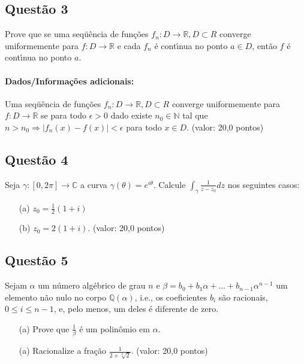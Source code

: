 \subsection{\color{blue} Quest\~ao 3}

Prove que se uma seqü\^encia de fun\c c\~oes $f_n: D \to \mathbb R, D \subset R$ converge uniformemente para $f: D \to \mathbb R$ e cada $f_n$ \'e cont\'\i nua no ponto $a \in D$, ent\~ao $f$ \'e cont\'\i nua no ponto $a$.

\paragraph{Dados/Informa\c c\~oes adicionais:} Uma seqü\^encia de fun\c c\~oes $f_n: D \to \mathbb R, D \subset R$ converge uniformemente para $f: D \to \mathbb R$ se para todo $\epsilon > 0$ dado existe $n_0 \in \mathbb N$ tal que $n > n_0 \Longrightarrow |f_n(x) - f(x)| < \epsilon$ para todo $x \in D$. (valor: 20,0 pontos)

\subsection{\color{blue} Quest\~ao 4}

Seja $\gamma: [0,2\pi] \to \mathbb C$ a curva $\gamma (\theta) = e^{i\theta}$. Calcule $\displaystyle \int_\gamma \frac1{z-z_0} dz$ nos seguintes casos:

\begin{enumerate}

\item[(a)] $z_0=\displaystyle \frac1{2} (1+i)$

\item[(b)] $z_0 = 2(1 + i)$. (valor: 20,0 pontos)

\end{enumerate}

\subsection{\color{blue} Quest\~ao 5}

Sejam $\alpha$ um n\'umero alg\'ebrico de grau $n$ e  $\beta = b_0 + b_1\alpha + ... + b_{n-1}\alpha^{n-1}$ um elemento n\~ao nulo no corpo $\mathbb Q(\alpha)$, i.e., os coeficientes $b_i$ s\~ao racionais, $0 \leq i \leq n-1$, e, pelo menos, um deles \'e diferente de zero.

\begin{enumerate}

\item[(a)] Prove que $\displaystyle\frac1{\beta}$ \'e um polinômio em $\alpha$.

\item[(a)] Racionalize a fra\c c\~ao $\displaystyle \frac1{2+\sqrt[3]{2}}$. (valor: 20,0 pontos)

\end{enumerate}

